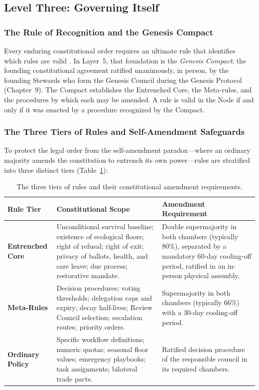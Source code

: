 \subsection{Level Three: Governing Itself}
\label{subsec:l5-level-three}

\subsubsection{The Rule of Recognition and the Genesis Compact}

Every enduring constitutional order requires an ultimate rule that identifies which rules are valid \parencite{hart1961}. In Layer~5, that foundation is the \textit{Genesis Compact}: the founding constitutional agreement ratified unanimously, in person, by the founding Stewards who form the Genesis Council during the Genesis Protocol (Chapter~9). The Compact establishes the Entrenched Core, the Meta-rules, and the procedures by which each may be amended. A rule is valid in the Node if and only if it was enacted by a procedure recognized by the Compact.

\subsubsection{The Three Tiers of Rules and Self-Amendment Safeguards}
\label{sec:l5-tiers}

To protect the legal order from the self-amendment paradox—where an ordinary majority amends the constitution to entrench its own power—rules are stratified into three distinct tiers (Table~\ref{tab:l5-tiers}):

\begin{table}[htbp]
\centering
\small
\setlength{\tabcolsep}{4pt}
\begin{tabular}{|p{}|p{}|p{}|}
\hline
\textbf{Rule Tier} & \textbf{Constitutional Scope} & \textbf{Amendment Requirement} \\
\hline
\textbf{Entrenched Core} & Unconditional survival baseline; existence of ecological floors; right of refusal; right of exit; privacy of ballots, health, and care leave; due process; restorative mandate. & Double supermajority in both chambers (typically 80\%), separated by a mandatory 60-day cooling-off period, ratified in an in-person physical assembly. \\
\hline
\textbf{Meta-Rules} & Decision procedures; voting thresholds; delegation caps and expiry; decay half-lives; Review Council selection; escalation routes; priority orders. & Supermajority in both chambers (typically 66\%) with a 30-day cooling-off period. \\
\hline
\textbf{Ordinary Policy} & Specific workflow definitions; numeric quotas; seasonal floor values; emergency playbooks; task assignments; bilateral trade pacts. & Ratified decision procedure of the responsible council in its required chambers. \\
\hline
\end{tabular}
\caption{The three tiers of rules and their constitutional amendment requirements.}
\label{tab:l5-tiers}
\end{table}

